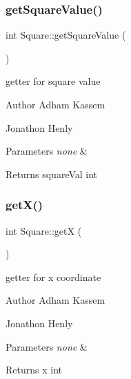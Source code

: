 \subsubsection{\texorpdfstring{get\+Square\+Value()}{getSquareValue()}}
{\footnotesize\ttfamily int Square\+::get\+Square\+Value (\begin{DoxyParamCaption}{ }\end{DoxyParamCaption})\hspace{0.3cm}{\ttfamily [inline]}}

getter for square value \begin{DoxyAuthor}{Author}
Adham Kassem 

Jonathon Henly 
\end{DoxyAuthor}

\begin{DoxyParams}{Parameters}
{\em none} & \\
\hline
\end{DoxyParams}
\begin{DoxyReturn}{Returns}
square\+Val int 
\end{DoxyReturn}
\mbox{\label{classSquare_a16d53c26c499c731898826701c1bee3f}} 
\subsubsection{\texorpdfstring{get\+X()}{getX()}}
{\footnotesize\ttfamily int Square\+::getX (\begin{DoxyParamCaption}{ }\end{DoxyParamCaption})\hspace{0.3cm}{\ttfamily [inline]}}

getter for x coordinate \begin{DoxyAuthor}{Author}
Adham Kassem 

Jonathon Henly 
\end{DoxyAuthor}

\begin{DoxyParams}{Parameters}
{\em none} & \\
\hline
\end{DoxyParams}
\begin{DoxyReturn}{Returns}
x int 
\end{DoxyReturn}
\mbox{\label{classSquare_a9c566a530c16ace9afb5861bf67739aa}} 
